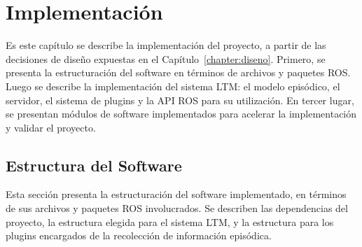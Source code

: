 \chapter{Implementación}\label{chapter:implementacion}

Es este capítulo se describe la implementación del proyecto, a partir de las decisiones de diseño expuestas en el Capítulo~\ref{chapter:diseno}. Primero, se presenta la estructuración del software en términos de archivos y paquetes ROS. Luego se describe la implementación del sistema LTM: el modelo episódico, el servidor, el sistema de plugins y la API ROS para su utilización. En tercer lugar, se presentan módulos de software implementados para acelerar la implementación y validar el proyecto.




\section{Estructura del Software}

Esta sección presenta la estructuración del software implementado, en términos de sus archivos y paquetes ROS involucrados. Se describen las dependencias del proyecto, la estructura elegida para el sistema LTM, y la estructura para los plugins encargados de la recolección de información episódica.

